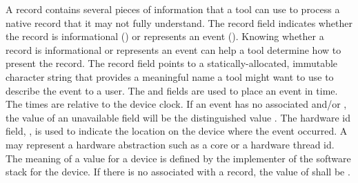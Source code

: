 A  record contains several
pieces of information that a tool can use to process a native record
that it may not fully understand. The record  field
indicates whether the record is informational
() or represents an event
(). Knowing whether a record
is informational or represents an event can help a tool determine
how to present the record. The record   field points to
a statically-allocated, immutable character string that provides
a meaningful name  a tool might want to use to describe the event
to a user. The  and  fields are
used to place an event in time. The times are relative to the device
clock. If an event has no associated  and/or
, the value of an unavailable field will be the
distinguished value . The hardware id field,
,  is used to indicate the location on the device where
the event occurred. A  may represent a hardware abstraction
such as a core or a hardware thread id. The meaning of a 
value for a device is defined by the implementer of the software
stack for the device. If there is no  associated with a
record, the value of  shall be .

